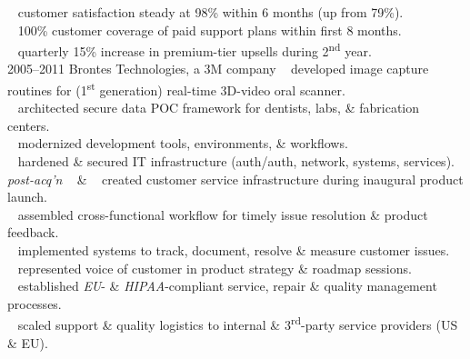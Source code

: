 \documentclass[]{friggeri-cv} %
\begin{document}
\begin{entrylist}
{{\tiny {}} ~ customer satisfaction steady at 98\% within 6 months (up from 79\%).\\
{\tiny {}} ~ 100\% customer coverage of paid support plans within first 8 months.\\
{\tiny {}} ~ quarterly 15\% increase in premium-tier upsells during 2\textsuperscript{nd} year.\\}
\entry
{2005--2011}
{Brontes Technologies, a 3M company}
{}
{{\tiny {}} ~ developed image capture routines for (1\textsuperscript{st} generation) real-time 3D-video oral scanner.\\
{\tiny {}} ~ architected secure data POC framework for dentists, labs, \& fabrication centers.\\
{\tiny {}} ~ modernized development tools, environments, \& workflows.\\
{\tiny {}} ~ hardened \& secured IT infrastructure (auth/auth, network, systems, services).}
\entry
{\emph{post-acq'n}}
{~}
{ \& }
{{\tiny {}} ~ created customer service infrastructure during inaugural product launch.\\
{\tiny {}} ~ assembled cross-functional workflow for timely issue resolution \& product feedback.\\
{\tiny {}} ~ implemented systems to track, document, resolve \& measure customer issues.\\

{\tiny {}} ~ represented voice of customer in product strategy \& roadmap sessions.\\
{\tiny {}} ~ established \emph{EU}- \& \emph{HIPAA}-compliant service, repair \& quality management processes.\\
{\tiny {}} ~ scaled support \& quality logistics to internal \& 3\textsuperscript{rd}-party service providers (US \& EU).\\

}
\end{entrylist}
\end{document}
